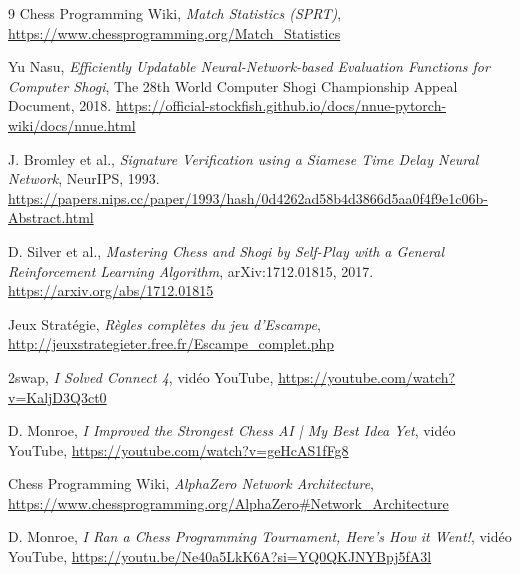 \documentclass[12pt,a4paper]{article}
\begin{document}
\begin{thebibliography}{9}
Chess Programming Wiki,
\textit{Match Statistics (SPRT)},
\url{https://www.chessprogramming.org/Match_Statistics}

Yu Nasu, \textit{Efficiently Updatable Neural-Network-based Evaluation Functions for Computer Shogi},
The 28th World Computer Shogi Championship Appeal Document, 2018.
\url{https://official-stockfish.github.io/docs/nnue-pytorch-wiki/docs/nnue.html}

J. Bromley et al.,
\textit{Signature Verification using a Siamese Time Delay Neural Network},
NeurIPS, 1993.
\url{https://papers.nips.cc/paper/1993/hash/0d4262ad58b4d3866d5aa0f4f9e1c06b-Abstract.html}

D. Silver et al.,
\textit{Mastering Chess and Shogi by Self-Play with a General Reinforcement Learning Algorithm},
arXiv:1712.01815, 2017.
\url{https://arxiv.org/abs/1712.01815}

Jeux Stratégie,
\textit{Règles complètes du jeu d'Escampe},
\url{http://jeuxstrategieter.free.fr/Escampe_complet.php}

2swap,
\textit{I Solved Connect 4}, vidéo YouTube,
\url{https://youtube.com/watch?v=KaljD3Q3ct0}

D. Monroe,
\textit{I Improved the Strongest Chess AI | My Best Idea Yet}, vidéo YouTube,
\url{https://youtube.com/watch?v=geHcAS1fFg8}

Chess Programming Wiki,
\textit{AlphaZero Network Architecture},
\url{https://www.chessprogramming.org/AlphaZero#Network_Architecture}

D. Monroe,
\textit{I Ran a Chess Programming Tournament, Here's How it Went!}, vidéo YouTube,
\url{https://youtu.be/Ne40a5LkK6A?si=YQ0QKJNYBpj5fA3l}

\end{thebibliography}
\end{document}
